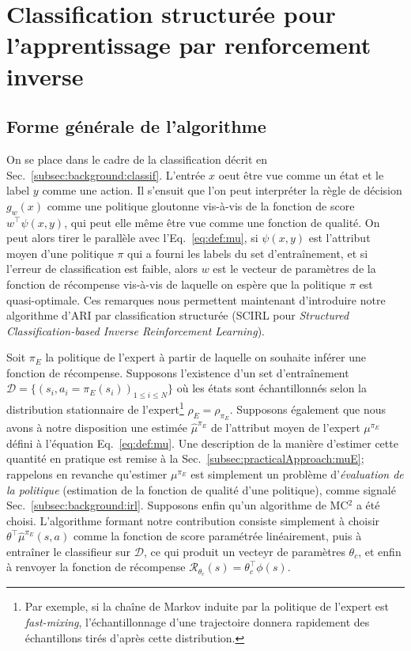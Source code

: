 \documentclass[english,utf8]{./hermes-journal}
\newcommand{\R}{\mathcal{R}}
\newcommand{\D}{\mathcal{D}}
\begin{document}
\section{Classification structurée pour l'apprentissage par renforcement inverse} \label{sec:scirl}

\subsection{Forme générale de l'algorithme}
\label{subsec:scirl:algo}

On se place dans le cadre de la classification décrit en Sec.~\ref{subsec:background:classif}. L'entrée $x$ oeut être vue comme un état et le label $y$ comme une action. Il s'ensuit que l'on peut interpréter la règle de décision 
$g_w(x)$ comme une politique gloutonne vis-à-vis de la fonction de score $w^\top \psi(x,y)$, qui peut elle même être vue comme une fonction de qualité. On peut alors tirer le parallèle avec l'Eq.~\eqref{eq:def:mu}, si $\psi(x,y)$ est l'attribut moyen d'une politique $\pi$ qui a fourni les labels du set d'entraînement, et si l'erreur de classification est faible, alors $w$ est le vecteur de paramètres de la fonction de récompense vis-à-vis de laquelle on espère que la politique $\pi$ est quasi-optimale. 
Ces remarques nous permettent maintenant d'introduire notre algorithme d'ARI par classification structurée (SCIRL pour \emph{Structured Classification-based Inverse Reinforcement Learning}).

Soit $\pi_E$ la politique de l'expert à partir de laquelle on souhaite inférer une fonction de récompense. Supposons l'existence d'un set d'entraînement $\D = \{(s_i,a_i=\pi_E(s_i))_{1\leq i\leq N}\}$ où les états sont échantillonnés selon la distribution stationnaire de l'expert\footnote{Par exemple, si la chaîne de Markov induite par la politique de l'expert est \emph{fast-mixing}, l'échantillonnage d'une trajectoire donnera rapidement des échantillons tirés d'après cette distribution.} $\rho_E = \rho_{\pi_E}$.
Supposons également que nous avons à notre disposition une estimée $\hat{\mu}^{\pi_E}$ de l'attribut moyen de l'expert $\mu^{\pi_E}$ défini à l'équation Eq.~\eqref{eq:def:mu}. Une description de la manière d'estimer cette quantité en pratique est remise à la Sec.~\ref{subsec:practicalApproach:muE}; rappelons en revanche qu'estimer $\mu^{\pi_E}$ est simplement un problème d'\emph{évaluation de la politique} (estimation de la fonction de qualité d'une politique), comme signalé Sec.~\ref{subsec:background:irl}. Supposons enfin qu'un algorithme de MC$^2$ a été choisi. L'algorithme formant notre contribution consiste simplement à choisir $\theta^\top\hat{\mu}^{\pi_E}(s,a)$ comme la fonction de score paramétrée linéairement, puis à entraîner le classifieur sur $\D$, ce qui produit un vecteyr de paramètres $\theta_c$, et enfin à renvoyer la fonction de récompense $\R_{\theta_c}(s) = \theta_c^\top \phi(s)$.
\end{document}
